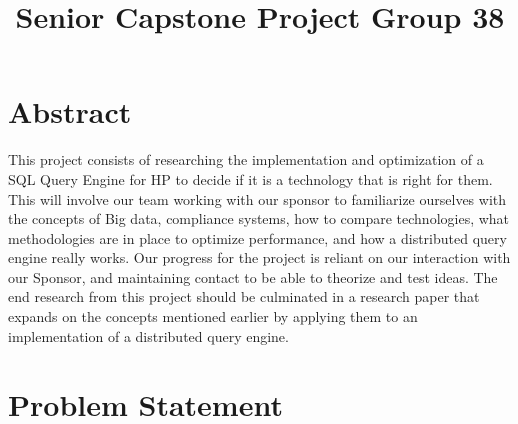 \documentclass[letterpaper,10pt,fleqn,draftclsnofoot,onecolumn]{IEEEtran}
\title{Senior Capstone Project Group 38}
\author{\name}
\begin{document}
	\maketitle
	\hrulefill
	\section*{\textbf{Abstract}}
	\indent This project consists of researching the implementation and optimization of a SQL Query Engine for HP to decide if it is a technology that is right for them. This will involve our team working with our sponsor to familiarize ourselves with the concepts of Big data, compliance systems, how to compare technologies, what methodologies are in place to optimize performance, and how a distributed query engine really works. Our progress for the project is reliant on our interaction with our Sponsor, and maintaining contact to be able to theorize and test ideas. The end research from this project should be culminated in a research paper that expands on the concepts mentioned earlier by applying them to an implementation of a distributed query engine.
	\newpage
	
	\section*{\textbf{Problem Statement}}
	
\end{document}
